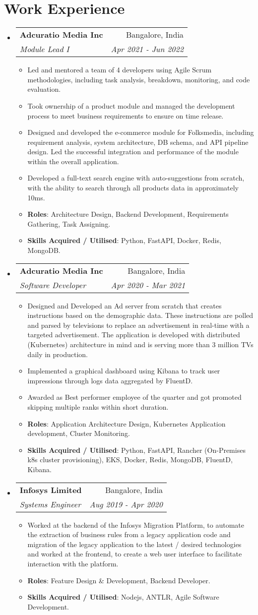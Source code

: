 \documentclass[a4paper,20pt]{article}
\makeatletter
\newcommand{\resumeItem}[2]{
  \item\small{
    \textbf{#1}{: #2 \vspace{-2pt}}
  }
}
\newcommand{\resumeItemWithoutTitle}[1]{
  \item\small{
    {#1\vspace{-2pt}}
  }
}
\newcommand{\resumeSubheading}[4]{
  \vspace{-1pt}\item
    \begin{tabular*}{0.97\textwidth}{l@{\extracolsep{\fill}}r}
      \textbf{#1} & #2 \\
      \textit{#3} & \textit{#4} \\
    \end{tabular*}\vspace{-5pt}
}
\newcommand{\resumeSubHeadingListStart}{\begin{itemize}[leftmargin=*]}
\newcommand{\resumeSubHeadingListEnd}{\end{itemize}}
\newcommand{\resumeItemListStart}{\begin{itemize}}
\newcommand{\resumeItemListEnd}{\end{itemize}\vspace{-5pt}}
\makeatother
\begin{document}
\section{Work Experience}
\resumeSubHeadingListStart
\resumeSubheading
{Adcuratio Media Inc}{Bangalore, India}
{Module Lead I}{Apr 2021 - Jun 2022}
\resumeItemListStart
\resumeItemWithoutTitle{Led and mentored a team of 4 developers using Agile Scrum methodologies, including task analysis, breakdown, monitoring, and code evaluation.}
\resumeItemWithoutTitle{Took ownership of a product module and managed the development process to meet business requirements to ensure on time release.}
\resumeItemWithoutTitle{Designed and developed the e-commerce module for Folksmedia, including requirement analysis, system architecture, DB schema, and API pipeline design. Led the successful integration and performance of the module within the overall application.}
\resumeItemWithoutTitle{Developed a full-text search engine with auto-suggestions from scratch, with the ability to search through all products data in approximately 10ms.}
\resumeItem{Roles}{Architecture Design, Backend Development, Requirements Gathering, Task Assigning.}
\resumeItem{Skills Acquired / Utilised}{Python, FastAPI, Docker, Redis, MongoDB.}
\resumeItemListEnd
\vspace{2pt}
\resumeSubheading
{Adcuratio Media Inc}{Bangalore, India}
{Software Developer}{Apr 2020 - Mar 2021}
\resumeItemListStart
\resumeItemWithoutTitle{Designed and Developed an Ad server from scratch that creates instructions based on the demographic data. These instructions are polled and parsed by televisions to replace an advertisement in real-time with a targeted advertisement. The application is developed with distributed (Kubernetes) architecture in mind and is serving more than 3 million TVs daily in production.}
\resumeItemWithoutTitle{Implemented a graphical dashboard using Kibana to track user impressions through logs data aggregated by FluentD.}
\resumeItemWithoutTitle{Awarded as Best performer employee of the quarter and got promoted skipping multiple ranks within short duration.}
\resumeItem{Roles}{Application Architecture Design, Kubernetes Application development, Cluster Monitoring.}
\resumeItem{Skills Acquired / Utilised}{Python, FastAPI, Rancher (On-Premises k8s cluster provisioning), EKS, Docker, Redis, MongoDB, FluentD, Kibana.}
\resumeItemListEnd
\vspace{2pt}
\resumeSubheading
{Infosys Limited}{Bangalore, India}
{Systems Engineer}{Aug 2019 - Apr 2020}
\resumeItemListStart
\resumeItemWithoutTitle{Worked at the backend of the Infosys Migration Platform, to automate the extraction of business rules from a legacy application code and migration of the legacy application to the latest / desired technologies and worked at the frontend, to create a web user interface to facilitate interaction with the platform.}
\resumeItem{Roles}{Feature Design \& Development, Backend Developer.}
\resumeItem{Skills Acquired / Utilised}{Nodejs, ANTLR, Agile Software Development.}
\resumeItemListEnd
\resumeSubHeadingListEnd
\vspace{-5pt}
\end{document}
